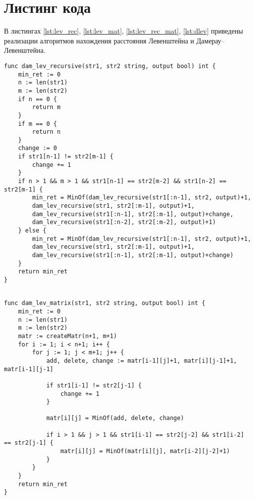 \section{Листинг кода}

 В листингах \ref{lst:lev_rec}, \ref{lst:lev_mat}, \ref{lst:lev_rec_mat}, \ref{lst:dlev} приведены реализации алгоритмов нахождения расстояния Левенштейна и Дамерау--Левенштейна.

\begin{lstlisting}[label=lst:lev_rec,caption=Функция нахождения расстояния Дамерау--Левенштейна с использованием рекурсии]
func dam_lev_recursive(str1, str2 string, output bool) int {
	min_ret := 0
	n := len(str1)
	m := len(str2)
	if n == 0 {
		return m
	}
	if m == 0 {
		return n
	}
	change := 0
	if str1[n-1] != str2[m-1] {
		change += 1
	}
	if n > 1 && m > 1 && str1[n-1] == str2[m-2] && str1[n-2] == str2[m-1] {
		min_ret = MinOf(dam_lev_recursive(str1[:n-1], str2, output)+1,
		dam_lev_recursive(str1, str2[:m-1], output)+1,
		dam_lev_recursive(str1[:n-1], str2[:m-1], output)+change,
		dam_lev_recursive(str1[:n-2], str2[:m-2], output)+1)
	} else {
		min_ret = MinOf(dam_lev_recursive(str1[:n-1], str2, output)+1,
		dam_lev_recursive(str1, str2[:m-1], output)+1,
		dam_lev_recursive(str1[:n-1], str2[:m-1], output)+change)
	}
	return min_ret
}
	
\end{lstlisting}

\begin{lstlisting}[label=lst:lev_mat,caption=Функция нахождения расстояния Дамерау--Левенштейна с использованием матрицы.]
func dam_lev_matrix(str1, str2 string, output bool) int {
	min_ret := 0
	n := len(str1)
	m := len(str2)
	matr := createMatr(n+1, m+1)
	for i := 1; i < n+1; i++ {
		for j := 1; j < m+1; j++ {
			add, delete, change := matr[i-1][j]+1, matr[i][j-1]+1, matr[i-1][j-1]
			
			if str1[i-1] != str2[j-1] {
				change += 1
			}
			
			matr[i][j] = MinOf(add, delete, change)
			
			if i > 1 && j > 1 && str1[i-1] == str2[j-2] && str1[i-2] == str2[j-1] {
				matr[i][j] = MinOf(matr[i][j], matr[i-2][j-2]+1)
			}
		}
	}
	return min_ret
}
	
\end{lstlisting}

